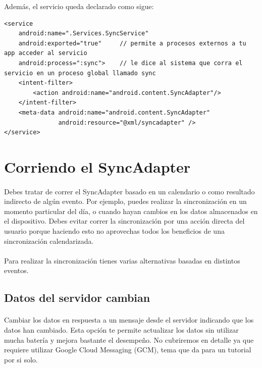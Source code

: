 \documentclass[10pt]{extarticle}
\begin{document}
Además, el servicio queda declarado como sigue:

\begin{lstlisting}
<service
	android:name=".Services.SyncService"
	android:exported="true"		// permite a procesos externos a tu app acceder al servicio
	android:process=":sync">    // le dice al sistema que corra el servicio en un proceso global llamado sync
	<intent-filter>
		<action android:name="android.content.SyncAdapter"/>
	</intent-filter>
	<meta-data android:name="android.content.SyncAdapter"
			   android:resource="@xml/syncadapter" />
</service>
\end{lstlisting}

\section{Corriendo el SyncAdapter}

\paragraph{}
Debes tratar de correr el SyncAdapter basado en un calendario o como resultado indirecto de algún evento. Por ejemplo, puedes realizar la sincronización en un momento particular del día, o cuando hayan cambios en los datos almacenados en el dispositivo. Debes evitar correr la sincronización por una acción directa del usuario porque haciendo esto no aprovechas todos los beneficios de una sincronización calendarizada.

\paragraph{}
Para realizar la sincronización tienes varias alternativas basadas en distintos eventos.

\subsection{Datos del servidor cambian}

\paragraph{}
Cambiar los datos en respuesta a un mensaje desde el servidor indicando que los datos han cambiado. Esta opción te permite actualizar los datos sin utilizar mucha batería y mejora bastante el desempeño. No cubriremos en detalle ya que requiere utilizar Google Cloud Messaging (GCM), tema que da para un tutorial por si solo.
\end{document}
